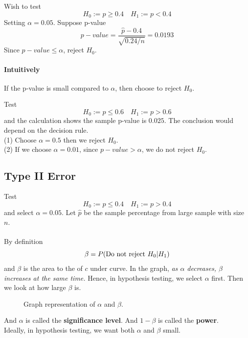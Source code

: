 \documentclass{article}
\begin{document}
		
		\begin{example}
			Wish to test
			\[
				H_0 := p \geq 0.4 \quad
				H_1 := p < 0.4
			\]
		Setting $\alpha = 0.05$. Suppose p-value
			\[
				p-value = \frac{\hat{p} - 0.4}{\sqrt{0.24/n}} = 0.0193
			\]
		Since $p-value \leq \alpha$, reject $H_0$.
		\end{example}
		\paragraph{Intuitively} If the p-value is small compared to $\alpha$, then choose to reject $H_0$.
		
		\begin{example}
			Test 
			\[
				H_0 := p \leq 0.6 \quad
				H_1 := p > 0.6
			\]
			and the calculation shows the sample p-value is $0.025$. The conclusion would depend on the decision rule.
			\\
			(1) Choose $\alpha=0.5$ then we reject $H_0$.
			\\
			(2) If we choose $\alpha=0.01$, since $p-value > \alpha$, we do not reject $H_0$.
		\end{example}
		
		\subsection{Type II Error}
		
		\begin{example}
			Test 
			\[
				H_0 := p \leq 0.4 \quad
				H_1 := p > 0.4
			\]
			and select $\alpha=0.05$. Let $\hat{p}$ be the sample percentage from large sample with size $n$.
		\end{example}
		\paragraph{}
			By definition
			\[
				\beta = P(\text{{Do not reject }}H_0 | H_1)
			\]
			and $\beta$ is the area to the  of $c$ under  curve. In the graph, \emph{as $\alpha$ decreases, $\beta$ increases at the same time.} Hence, in hypothesis testing, we select $\alpha$ first. Then we look at how large $\beta$ is.
		
		\begin{figure}[h]
			\centering
			\caption{Graph representation of $\alpha$ and $\beta$.}
		\end{figure}
		
		And $\alpha$ is called the \textbf{significance level}. And $1-\beta$ is called the \textbf{power}.
		\\
		Ideally, in hypothesis testing, we want both $\alpha$ and $\beta$ small.
		
\end{document}

